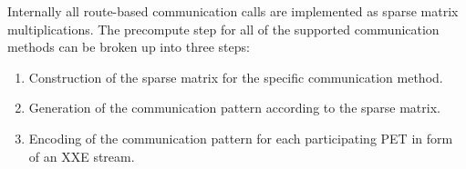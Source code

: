 

Internally all route-based communication calls are implemented as sparse matrix multiplications. The precompute step for all of the supported communication methods can be broken up into three steps:
\begin{enumerate}
\item Construction of the sparse matrix for the specific communication method.
\item Generation of the communication pattern according to the sparse matrix.
\item Encoding of the communication pattern for each participating PET in form of an XXE stream.
\end{enumerate}
